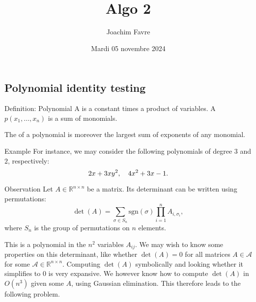 \documentclass[a4paper]{article}
\title{Algo 2}
\author{Joachim Favre}
\date{Mardi 05 novembre 2024}
\begin{document}
\maketitle


\subsection{Polynomial identity testing}

\begin{parag}{Definition: Polynomial}
    A  is a constant times a product of variables. A  $p\left(x_1, \ldots, x_n\right)$ is a sum of monomials.

    The  of a polynomial is moreover the largest sum of exponents of any monomial.

    \begin{subparag}{Example}
        For instance, we may consider the following polynomials of degree $3$ and $2$, respectively: 
        \[2x + 3xy^2, \quad 4x^2 + 3x - 1.\]
    \end{subparag}
\end{parag}

\begin{parag}{Observation}
    Let $A \in \mathbb{R}^{n \times n}$ be a matrix. Its determinant can be written using permutations: 
    \[\det\left(A\right) = \sum_{\sigma \in S_n} \text{sgn}\left(\sigma\right) \prod_{i=1}^{n} A_{i, \sigma_i},\]
    where $S_n$ is the group of permutations on $n$ elements.

    This is a polynomial in the $n^2$ variables $A_{ij}$. We may wish to know some properties on this determinant, like whether $\det\left(A\right) = 0$ for all matrices $A \in \mathcal{A}$ for some $\mathcal{A} \in \mathbb{R}^{n \times n}$. Computing $\det\left(A\right)$ symbolically and looking whether it simplifies to $0$ is very expansive. We however know how to compute $\det\left(A\right)$ in $O\left(n^3\right)$ given some $A$, using Gaussian elimination. This therefore leads to the following problem.
\end{parag}
\end{document}
